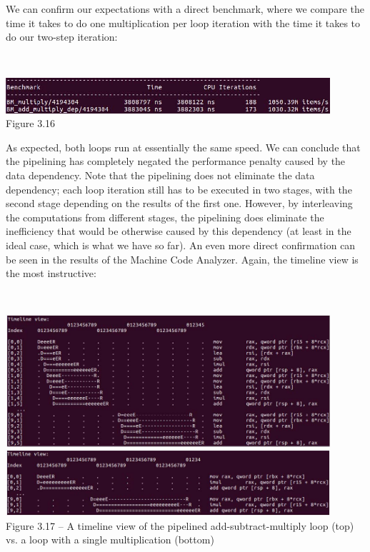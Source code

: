 We can confirm our expectations with a direct benchmark, where we compare the time it takes to do one multiplication per loop iteration with the time it takes to do our two-step iteration:

\hspace*{\fill} \\ %
\begin{center}
\includegraphics[width=0.9\textwidth]{content/1/chapter3/images/16.jpg}\\
Figure 3.16
\end{center}

As expected, both loops run at essentially the same speed. We can conclude that the pipelining has completely negated the performance penalty caused by the data dependency. Note that the pipelining does not eliminate the data dependency; each loop iteration still has to be executed in two stages, with the second stage depending on the results of the first one. However, by interleaving the computations from different stages, the pipelining does eliminate the inefficiency that would be otherwise caused by this dependency (at least in the ideal case, which is what we have so far). An even more direct confirmation can be seen in the results of the Machine Code Analyzer. Again, the timeline view is the most instructive:

\hspace*{\fill} \\ %
\begin{center}
\includegraphics[width=0.9\textwidth]{content/1/chapter3/images/17.jpg}\\
Figure 3.17 – A timeline view of the pipelined add-subtract-multiply loop (top) vs. a loop with a single multiplication (bottom)
\end{center}

